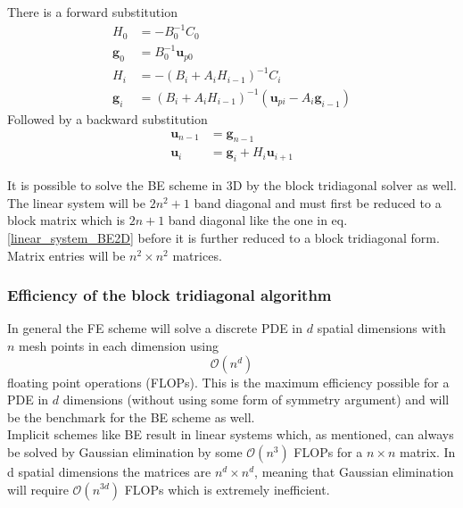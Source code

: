 \noindent There is a forward substitution
\begin{align}\label{block_tridiag_alg}
 H_0 &= -B_0^{-1}C_0\nonumber \\
 \mathbf{g}_0 &= B_0^{-1}\mathbf{u}_{p0} \nonumber\\
 H_i &= -\left(B_i+A_iH_{i-1}\right)^{-1}C_i \nonumber \\
 \mathbf{g}_i &= \left(B_i+A_iH_{i-1}\right)^{-1}\left(\mathbf{u}_{pi}-A_i\mathbf{g}_{i-1}\right)
 \end{align}
 Followed by a backward substitution
 \begin{align*}
  \mathbf{u}_{n-1} &= \mathbf{g}_{n-1}\nonumber\\
  \mathbf{u}_i &= \mathbf{g}_i + H_i\mathbf{u}_{i+1} \nonumber
 \end{align*}
 
 \noindent It is possible to solve the BE scheme in 3D by the block tridiagonal solver as well. 
 The linear system will be $2n^2 +1$ band diagonal and must first be reduced to a block matrix which is $2n+1$ band diagonal like the one in eq. \eqref{linear_system_BE2D} before it is further reduced to a block tridiagonal form. 
 Matrix entries will be $n^2\times n^2$ matrices.
 
 \subsubsection{Efficiency of the block tridiagonal algorithm}
 
 In general the FE scheme will solve a discrete PDE in $d$ spatial dimensions with $n$ mesh points in each dimension using
 \begin{equation*}
  \mathcal O(n^d)
 \end{equation*}
floating point operations (FLOPs). 
This is the maximum efficiency possible for a PDE in $d$ dimensions (without using some form of symmetry argument) and will be the benchmark for the BE scheme as well.\\

Implicit schemes like BE result in linear systems which, as mentioned, can always be solved by Gaussian elimination by some $\mathcal O(n^3)$ FLOPs for a $n\times n$ matrix. 
In d spatial dimensions the matrices are $n^d\times n^d$, meaning that Gaussian elimination will require $\mathcal{O}(n^{3d})$ FLOPs which is extremely inefficient. 


